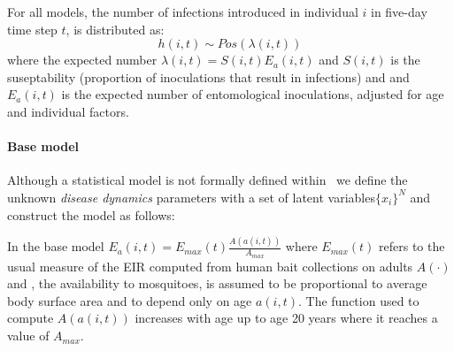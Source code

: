 \documentclass{article}
\begin{document}
For all models, the number of infections  introduced in individual $i$ in five-day time step $t$, is distributed as:
\begin{equation}
  h(i,t) \sim \textit{Pos}(\lambda(i,t))
\end{equation}
where the expected number $\lambda(i,t) = S(i,t)E_a(i,t)$ and $S(i,t)$ is the suseptability
(proportion of inoculations that result in infections) and and $E_{a}(i,t)$ is the expected number of entomological inoculations, adjusted for age and individual factors.


\paragraph{Base model}
Although a statistical model is not formally defined within~\cite{smith2006relationship}
we define the unknown \emph{disease dynamics} parameters with a set of latent variables$\{x_{i}\}^{N}$
and construct the model as follows: 

In the base model $E_{a}(i,t) = E_{max}(t) \frac{A(a(i,t))}{A_{max}}$ where $E_{max}(t)$ refers to the usual measure of the EIR computed from human bait collections on adults $A(\cdot)$ and , the availability to mosquitoes,
 is assumed to be proportional to average body surface area and to depend only on age $a(i,t)$.
The function used to compute $A(a(i,t))$ increases with age up to age 20 years where it reaches a value of $A_{max}$.
\end{document}
